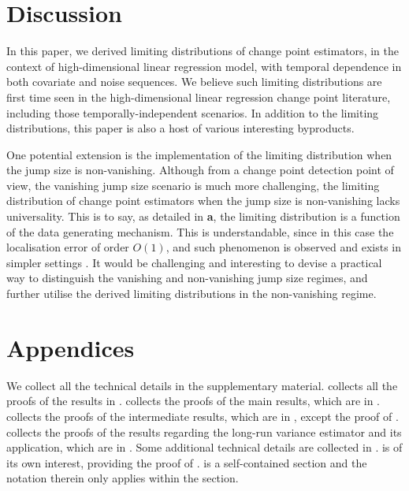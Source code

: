 \documentclass[11pt]{article}
\theoremstyle{plain}
\theoremstyle{definition}
\newcommand{\zifeng}[1]{\textcolor{purple}{(Zifeng: #1)}}
\begin{document}
\section{Discussion}

In this paper, we derived limiting distributions of change point estimators, in the context of high-dimensional linear regression model, with temporal dependence in both covariate and noise sequences.  We believe such limiting distributions are first time seen in the high-dimensional linear regression change point literature, including those temporally-independent scenarios.  In addition to the limiting distributions, this paper is also a host of various interesting byproducts.

One potential extension is the implementation of the limiting distribution when the jump size is non-vanishing.  Although from a change point detection point of view, the vanishing jump size scenario is much more challenging, the limiting distribution of change point estimators when the jump size is non-vanishing lacks universality.  This is to say, as detailed in \textbf{a}, the limiting distribution is a function of the data generating mechanism.  This is understandable, since in this case the localisation error of order $O(1)$, and such phenomenon is observed and exists in simpler settings \citep[e.g.][]{yao1988estimating, aue2009estimation, mukherjee2022robust}.  It would be challenging and interesting to devise a practical way to distinguish the vanishing and non-vanishing jump size regimes, and further utilise the derived limiting distributions in the non-vanishing regime.




\clearpage




\clearpage
\appendix


\section*{Appendices}
We collect all the technical details in the supplementary material.   collects all the proofs of the results in .   collects the proofs of the main results, which are in .   collects the proofs of the intermediate results, which are in , except the proof of  .   collects the proofs of the results regarding the long-run variance estimator and its application, which are in .  Some additional technical details are collected in .   is of its own interest, providing the proof of .   is a self-contained section and the notation therein only applies within the section.
\end{document}
